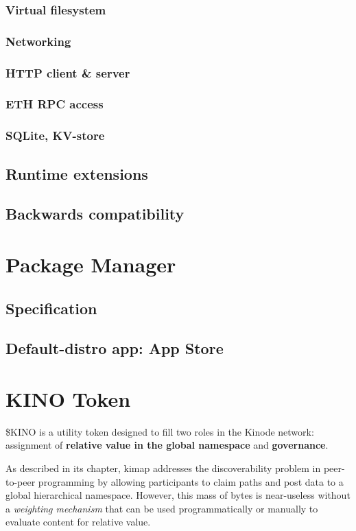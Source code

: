 \documentclass[runningheads]{llncs}
\begin{document}
\subsubsection{Virtual filesystem}
\subsubsection{Networking}
\subsubsection{HTTP client \& server}
\subsubsection{ETH RPC access}
\subsubsection{SQLite, KV-store}
\subsection{Runtime extensions}
\subsection{Backwards compatibility}
%
%
%
\section{Package Manager}
\subsection{Specification}
\subsection{Default-distro app: App Store}
%
%
%
\section{KINO Token}

\$KINO is a utility token designed to fill two roles in the Kinode network: assignment of \textbf{relative value in the global namespace} and \textbf{governance}.

As described in its chapter, kimap addresses the discoverability problem in peer-to-peer programming by allowing participants to claim paths and post data to a global hierarchical namespace.
However, this mass of bytes is near-useless without a \textit{weighting mechanism} that can be used programmatically or manually to evaluate content for relative value.
\end{document}

